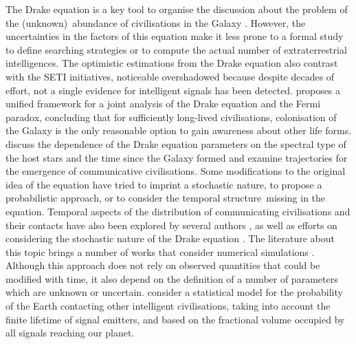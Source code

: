 \documentclass[crop]{CSLB}
\begin{document}
%
The Drake equation is a key tool to organise the discussion about the problem of the (unknown) abundance of civilisations in the Galaxy \citep{hinkel_interdisciplinary_2019}.
%
However, the uncertainties in the factors of this equation make it less prone to a formal study to define searching strategies or to compute the actual number of extraterrestrial intelligences.
%
The optimistic estimations from the Drake equation also contrast with the SETI initiatives, noticeable overshadowed because despite decades of effort, not a single evidence for intelligent signals has been detected.
%
\citet{prantzos_joint_2013} proposes a unified framework for a joint analysis of the Drake equation and the Fermi paradox, concluding that for sufficiently long-lived civilisations, colonisation of the Galaxy is the only reasonable option to gain awareness about other life forms.
%
\citet{haqq-misra_drake_2017} discuss the dependence of the Drake equation parameters on the spectral type of the host stars and the time since the Galaxy formed and examine trajectories for the emergence of communicative civilisations.
%
Some modifications to the original idea of the equation have tried to imprint a stochastic nature, to propose a probabilistic approach, or to consider the temporal structure missing in the equation.
%
Temporal aspects of the distribution of communicating civilisations and their contacts have also been explored by several authors \citep{fogg_temporal_1987, forgan_spatiotemporal_2011, balbi_impact_2018, balb_spatiotemporal_2018, horvat_impact_2011}, as well as efforts on considering the stochastic nature of the Drake equation \citep{glade_stochastic_2011}.
%
The literature about this topic brings a number of works that consider numerical simulations
\citep{forgan_evaluating_2015, vukotic_grandeur_2016, murante_simulating_2015, forgan_numerical_2009, forgan_galactic_2017, ramirez_new_2017}.
%
Although this approach does not rely on observed quantities that could be modified with time, it also depend on the definition of a number of parameters which are unknown or uncertain.
%
\citet{grimaldi_signal_2017} consider a statistical model for the probability of the Earth contacting other intelligent civilisations, taking into account the finite lifetime of signal emitters, and based on the fractional volume occupied by all signals reaching our planet.
\end{document}
